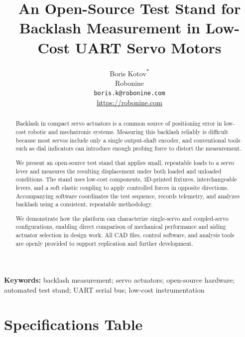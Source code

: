 \documentclass[11pt,letterpaper]{article}
\title{An Open-Source Test Stand for Backlash Measurement in Low-Cost UART Servo Motors}
\author{Boris Kotov\textsuperscript{*}\\
Robonine\\
\texttt{boris.k@robonine.com}\\
\url{https://robonine.com}}
\date{}
\begin{document}
\maketitle

\begin{abstract}
Backlash in compact servo actuators is a common source of positioning error in low-cost robotic and mechatronic systems. Measuring this backlash reliably is difficult because most servos include only a single output-shaft encoder, and conventional tools such as dial indicators can introduce enough probing force to distort the measurement.

We present an open-source test stand that applies small, repeatable loads to a servo lever and measures the resulting displacement under both loaded and unloaded conditions. The stand uses low-cost components, 3D-printed fixtures, interchangeable levers, and a soft elastic coupling to apply controlled forces in opposite directions. Accompanying software coordinates the test sequence, records telemetry, and analyzes backlash using a consistent, repeatable methodology.

We demonstrate how the platform can characterize single-servo and coupled-servo configurations, enabling direct comparison of mechanical performance and aiding actuator selection in design work. All CAD files, control software, and analysis tools are openly provided to support replication and further development.
\end{abstract}

\noindent\textbf{Keywords:} backlash measurement; servo actuators; open-source hardware; automated test stand; UART serial bus; low-cost instrumentation

\newpage
\section*{Specifications Table}
\end{document}
